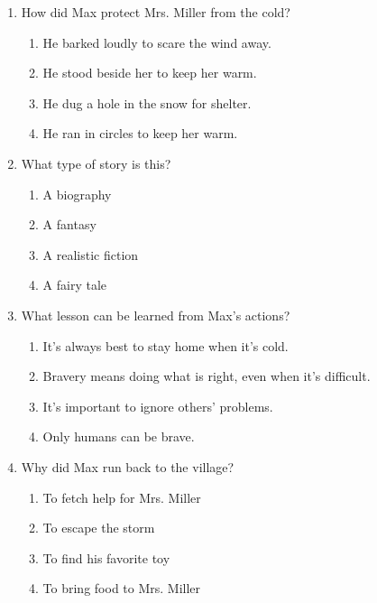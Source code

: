 \documentclass[12pt]{article}
\begin{document}
\begin{enumerate}
    \vspace{0.5cm}

    \item How did Max protect Mrs. Miller from the cold?

    \begin{enumerate}[label=\Alph*.]
        \item He barked loudly to scare the wind away.
        \item He stood beside her to keep her warm.
        \item He dug a hole in the snow for shelter.
        \item He ran in circles to keep her warm.
    \end{enumerate}
    
    \vspace{0.5cm}

    \item What type of story is this?

    \begin{enumerate}[label=\Alph*.]
        \item A biography
        \item A fantasy
        \item A realistic fiction
        \item A fairy tale
    \end{enumerate}
    
    \vspace{0.5cm}

    \item What lesson can be learned from Max’s actions?

    \begin{enumerate}[label=\Alph*.]
        \item It’s always best to stay home when it’s cold.
        \item Bravery means doing what is right, even when it’s difficult.
        \item It’s important to ignore others’ problems.
        \item Only humans can be brave.
    \end{enumerate}
    
    \vspace{0.5cm}

    \item Why did Max run back to the village?

    \begin{enumerate}[label=\Alph*.]
        \item To fetch help for Mrs. Miller
        \item To escape the storm
        \item To find his favorite toy
        \item To bring food to Mrs. Miller
    \end{enumerate}
    

\end{enumerate}
\end{document}
